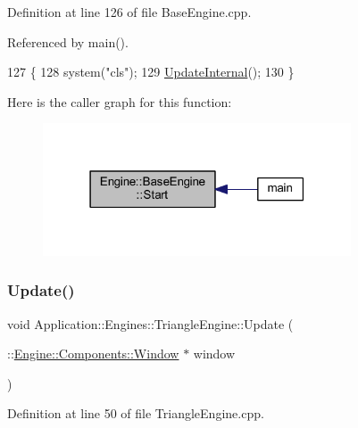 Definition at line 126 of file Base\+Engine.\+cpp.



Referenced by main().


\begin{DoxyCode}
127 \{
128     system(\textcolor{stringliteral}{"cls"});
129     \mbox{\hyperlink{classEngine_1_1BaseEngine_aad3c237ca657b9f22f76fccf7fc7561f}{UpdateInternal}}();
130 \}
\end{DoxyCode}
Here is the caller graph for this function\+:
\nopagebreak
\begin{figure}[H]
\begin{center}
\leavevmode
\includegraphics[width=259pt]{classEngine_1_1BaseEngine_a525fdc7a1da7eecb514ad5763f06be79_icgraph}
\end{center}
\end{figure}
\mbox{\label{classApplication_1_1Engines_1_1TriangleEngine_a0578bee716800df84d59f13c291bc6d0}} 
\subsubsection{\texorpdfstring{Update()}{Update()}\hspace{0.1cm}{\footnotesize\ttfamily [1/2]}}
{\footnotesize\ttfamily void Application\+::\+Engines\+::\+Triangle\+Engine\+::\+Update (\begin{DoxyParamCaption}\item[{\+::\mbox{\hyperlink{classEngine_1_1Components_1_1Window}{Engine\+::\+Components\+::\+Window}} $\ast$}]{window }\end{DoxyParamCaption})\hspace{0.3cm}{\ttfamily [override]}}



Definition at line 50 of file Triangle\+Engine.\+cpp.


